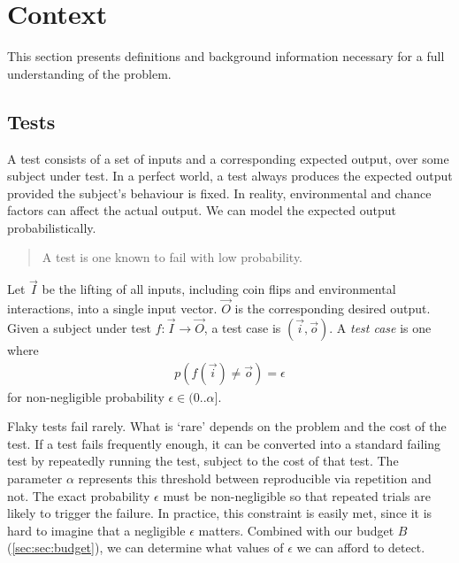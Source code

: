 \section{Context}
\label{sec:context}

This section presents definitions and background information necessary for a
full understanding of the problem.


\subsection{\Flaky Tests}
\label{sec:sec:flaky_tests}

A test consists of a set of inputs and a corresponding expected output, over
some subject under test. In a perfect world, a test always produces the expected
output provided the subject's behaviour is fixed. In reality, environmental and
chance factors can affect the actual output. We can model the expected output
probabilistically.

\begin{quote}
	A \flaky test is one known to fail with low probability.
\end{quote}

\begin{defn}
\label{def:flaky_test}

Let $\vec{I}$ be the lifting of all inputs, including coin flips and
environmental interactions, into a single input vector. $\vec{O}$ is the
corresponding desired output. Given a subject under test $f: \vec{I} \rightarrow
\vec{O}$, a test case is $(\vec{i},\vec{o})$. A \emph{\flaky test case} is one
where
%
\begin{align*}
  p(f(\vec{i}) \ne \vec{o}) = \epsilon
\end{align*}
%
for non-negligible probability $\epsilon \in (0..\alpha]$.

\end{defn}

Flaky tests fail rarely.  What is {\lq}rare{\rq} depends on the problem and the
cost of the test.  If a test fails frequently enough, it can be converted into a
standard failing test by repeatedly running the test, subject to the cost of
that test.  The parameter $\alpha$ represents this threshold between
reproducible via repetition and not.  The exact probability $\epsilon$ must be
non-negligible so that repeated trials are likely to trigger the failure.  In
practice, this constraint is easily met, since it is hard to imagine that a
negligible $\epsilon$ matters.  Combined with our budget $B$
(\autoref{sec:sec:budget}), we can determine what values of $\epsilon$ we can
afford to detect.

